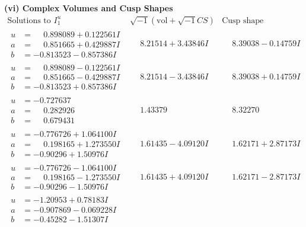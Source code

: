 \documentclass[1p]{elsarticle_modified}
\theoremstyle{definition}
\newcommand{\I}{\sqrt{-1}}
\begin{document}
\newpage\flushleft \textbf{(vi) Complex Volumes and Cusp Shapes}
$$\begin{array}{c|c|c}  
\text{Solutions to }I^u_{1}& \I (\text{vol} + \sqrt{-1}CS) & \text{Cusp shape}\\
 \hline 
\begin{aligned}
u &= \phantom{-}0.898089 + 0.122561 I \\
a &= \phantom{-}0.851665 + 0.429887 I \\
b &= -0.813523 - 0.857386 I\end{aligned}
 & \phantom{-}8.21514 + 3.43846 I & \phantom{-}8.39038 - 0.14759 I \\ \hline\begin{aligned}
u &= \phantom{-}0.898089 - 0.122561 I \\
a &= \phantom{-}0.851665 - 0.429887 I \\
b &= -0.813523 + 0.857386 I\end{aligned}
 & \phantom{-}8.21514 - 3.43846 I & \phantom{-}8.39038 + 0.14759 I \\ \hline\begin{aligned}
u &= -0.727637\phantom{ +0.000000I} \\
a &= \phantom{-}0.282926\phantom{ +0.000000I} \\
b &= \phantom{-}0.679431\phantom{ +0.000000I}\end{aligned}
 & \phantom{-}1.43379\phantom{ +0.000000I} & \phantom{-}8.32270\phantom{ +0.000000I} \\ \hline\begin{aligned}
u &= -0.776726 + 1.064100 I \\
a &= \phantom{-}0.198165 + 1.273550 I \\
b &= -0.90296 + 1.50976 I\end{aligned}
 & \phantom{-}1.61435 - 4.09120 I & \phantom{-}1.62171 + 2.87173 I \\ \hline\begin{aligned}
u &= -0.776726 - 1.064100 I \\
a &= \phantom{-}0.198165 - 1.273550 I \\
b &= -0.90296 - 1.50976 I\end{aligned}
 & \phantom{-}1.61435 + 4.09120 I & \phantom{-}1.62171 - 2.87173 I \\ \hline\begin{aligned}
u &= -1.20953 + 0.78183 I \\
a &= -0.907869 - 0.069228 I \\
b &= -0.45282 - 1.51307 I\end{aligned}

\end{array}$$
\end{document}
